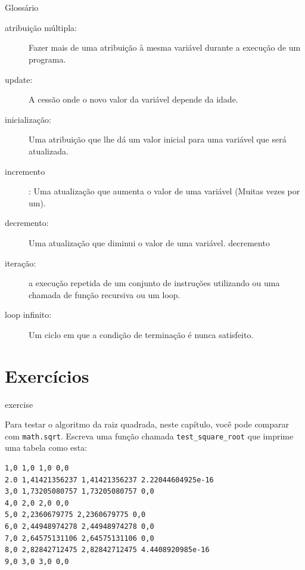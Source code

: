 \documentclass[10pt]{book}
\begin{document}
\begin{exercise}
{\section{} Glossário

\begin{description}

\item[atribuição múltipla:] Fazer mais de uma atribuição à mesma
variável durante a execução de um programa.

\item[update:] A cessão onde o novo valor da variável
depende da idade.

\item[inicialização:] Uma atribuição que lhe dá um valor inicial para
uma variável que será atualizada.

\item[incremento]: Uma atualização que aumenta o valor de uma variável
(Muitas vezes por um).

\item[decremento:] Uma atualização que diminui o valor de uma variável.
\index{} decremento

\item[iteração:] a execução repetida de um conjunto de instruções utilizando
ou uma chamada de função recursiva ou um loop.

\item[loop infinito:] Um ciclo em que a condição de terminação é
nunca satisfeito.

\end{description}


\section{Exercícios}

\begin{} exercise

Para testar o algoritmo da raiz quadrada, neste capítulo, você pode comparar
com {\tt math.sqrt}. Escreva uma função chamada \verb "test_square_root"
que imprime uma tabela como esta:

\begin{verbatim}
1,0 1,0 1,0 0,0
2.0 1,41421356237 1,41421356237 2.22044604925e-16
3,0 1,73205080757 1,73205080757 0,0
4,0 2,0 2,0 0,0
5,0 2,2360679775 2,2360679775 0,0
6,0 2,44948974278 2,44948974278 0,0
7,0 2,64575131106 2,64575131106 0,0
8,0 2,82842712475 2,82842712475 4.4408920985e-16
9,0 3,0 3,0 0,0


\end{verbatim}
\end{}}
\end{exercise}
\end{document}
